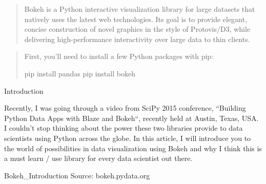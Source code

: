 
\begin{frame}
\begin{framed}
\begin{quote}
Bokeh is a Python interactive visualization library for large datasets that natively uses the latest web technologies. Its goal is to provide elegant, concise construction of novel 
graphics in the style of Protovis/D3, while delivering high-performance interactivity over large data to thin clients.

\end{quote}
\end{framed}
\end{frame}
\begin{frame}
\begin{framed}
\begin{quote}
First, you’ll need to install a few Python packages with pip:

pip install pandas
pip install bokeh
\end{quote}
\end{framed}
Introduction

Recently, I was going through a video from SciPy 2015 conference, “Building Python Data Apps with Blaze and Bokeh“, recently held at Austin, Texas, USA. I couldn’t stop thinking about the power these two libraries provide to data scientists using Python across the globe. In this article, I will introduce you to the world of possibilities in data visualization using Bokeh and why I think this is a must learn / use library for every data scientist out there.

Bokeh_Introduction Source: bokeh.pydata.org
\end{frame}
